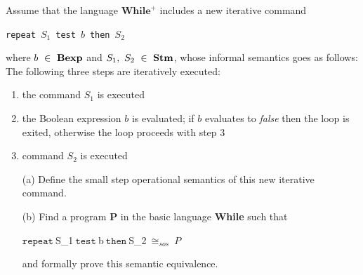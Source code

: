 \newcommand{\repeatSbS}[3]{\texttt{repeat}~#1~\texttt{test}~#2~\texttt{then}~#3}

\newcommand{\PDef}{$\concat{$S_1$}{$\wbS{b}{(\concat{$S_2$}{$S_1$})}$}$}

\newcommand{\exThreeB}{$\repeatSbS{S_1}{b}{S_2}~\cong_{sos}~\PDef{}$}

\newcommand{\exThreeIff}{$
\confSs{\repeatSbS{S_1}{b}{S_2}}{s}\Rar{*}s'~\iff~
\confSs{\PDef{}}{s}\Rar{*}s'$}

\newcommand{\exThreeLtR}{$
\confSs{\repeatSbS{S_1}{b}{S_2}}{s}\Rar{*}s'~\Longrightarrow~
\confSs{\PDef{}}{s}\Rar{*}s'$}

\newcommand{\exThreeRtL}{$
\confSs{\PDef{}}{s}\Rar{*}s'~\Longrightarrow~
\confSs{\repeatSbS{S_1}{b}{S_2}}{s}\Rar{*}s'$}

{
	Assume that the language $\textbf{While}^{\textbf{+}}$ includes a new
	iterative command
	\begin{center}
	\repeatSbS{$S_1$}{$b$}{$S_2$}
	\end{center}
	where $b~\in~\mbox{\textbf{Bexp}}$ and $S_1,~S_2~\in~\mbox{\textbf{Stm}}$, whose informal semantics goes
	as follows:\\The following three steps are iteratively executed:
	\begin{enumerate}
	\item the command $S_1$ is executed
	\item the Boolean expression $b$ is evaluated; if $b$ evaluates to 
	\emph{false} then the loop is exited, otherwise the loop proceeds with step
	3
	\item command $S_2$ is executed
	\end{enumerate}
	\begin{itemize}
	\item [(a)] Define the small step operational semantics of this new
	iterative command.
	\item [(b)] Find a program \textbf{P} in the basic language \textbf{While} such that
	\begin{center}
	$\repeatSbS{$S_1$}{$b$}{$S_2$}~\cong_{sos}~P$
	\end{center}
	and formally prove this semantic equivalence.
	\end{itemize}
}
